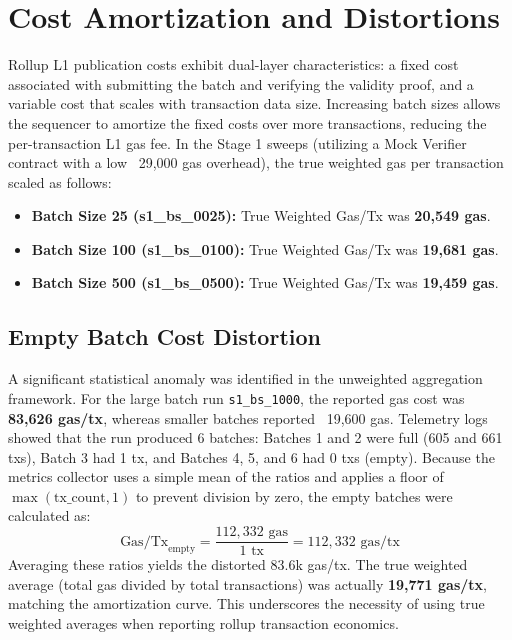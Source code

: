 \section{Cost Amortization and Distortions}
\label{sec:cost_results}
Rollup L1 publication costs exhibit dual-layer characteristics: a fixed cost associated with submitting the batch and verifying the validity proof, and a variable cost that scales with transaction data size. Increasing batch sizes allows the sequencer to amortize the fixed costs over more transactions, reducing the per-transaction L1 gas fee.
In the Stage 1 sweeps (utilizing a Mock Verifier contract with a low ~29,000 gas overhead), the true weighted gas per transaction scaled as follows:
\begin{itemize}
    \item \textbf{Batch Size 25 (s1\_bs\_0025):} True Weighted Gas/Tx was \textbf{20,549 gas}.
    \item \textbf{Batch Size 100 (s1\_bs\_0100):} True Weighted Gas/Tx was \textbf{19,681 gas}.
    \item \textbf{Batch Size 500 (s1\_bs\_0500):} True Weighted Gas/Tx was \textbf{19,459 gas}.
\end{itemize}
\subsection{Empty Batch Cost Distortion}
A significant statistical anomaly was identified in the unweighted aggregation framework. For the large batch run \texttt{s1\_bs\_1000}, the reported gas cost was \textbf{83,626 gas/tx}, whereas smaller batches reported ~19,600 gas. 
Telemetry logs showed that the run produced 6 batches: Batches 1 and 2 were full (605 and 661 txs), Batch 3 had 1 tx, and Batches 4, 5, and 6 had 0 txs (empty). Because the metrics collector uses a simple mean of the ratios and applies a floor of $\max(\text{tx\_count}, 1)$ to prevent division by zero, the empty batches were calculated as:
\begin{equation}
\text{Gas/Tx}_{\text{empty}} = \frac{112,332\text{ gas}}{1\text{ tx}} = 112,332\text{ gas/tx}
\end{equation}
Averaging these ratios yields the distorted 83.6k gas/tx. The true weighted average (total gas divided by total transactions) was actually \textbf{19,771 gas/tx}, matching the amortization curve. This underscores the necessity of using true weighted averages when reporting rollup transaction economics.
